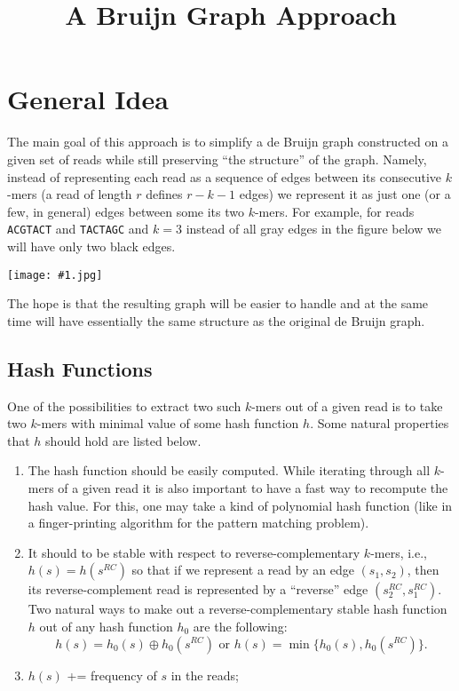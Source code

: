 \documentclass[12pt]{article}
\newcommand{\jpgpic}[1]{\begin{center}\texttt{[image: \#1.jpg]}\end{center}}
\begin{document}
\title{A Bruijn Graph Approach}
\maketitle

\section{General Idea}

The main goal of this approach is to simplify a de Bruijn graph
constructed on a given set of reads while still preserving 
``the structure'' of the graph. Namely, instead 
of representing each read as a sequence of edges 
between its consecutive $k$-mers (a read of length $r$ defines
$r-k-1$ edges) we represent it as just one (or a few, in general)
edges between some its two $k$-mers. For example, for 
reads {\tt ACGTACT} and {\tt TACTAGC} and $k=3$
instead of all gray edges in the figure below we will have 
only two black edges.
\jpgpic{fig1}
The hope is that the resulting graph will be easier to handle 
and at the same time will have essentially the same structure 
as the original de Bruijn graph.

\subsection{Hash Functions}

One of the possibilities to extract two such $k$-mers out of a given
read is to take two $k$-mers with minimal value of some hash function $h$.
Some natural properties that $h$ should hold are listed below.
\begin{enumerate}
  \item The hash function should be easily computed.
  While iterating through all $k$-mers of a given read
  it is also important to have a fast way to recompute 
  the hash value. For this, one may take a kind of polynomial
  hash function (like in a finger-printing algorithm for the pattern 
  matching problem).
  \item It should to be stable with respect to reverse-complementary 
  $k$-mers, i.e., $h(s) = h(s^{RC})$ so that if we represent a read
  by an edge $(s_1,s_2)$, then its reverse-complement read is represented by 
  a ``reverse'' edge $(s_2^{RC},s_1^{RC})$. Two natural ways to make out a
  reverse-complementary stable hash function $h$ out of any hash function 
  $h_0$ are the following:
  \[h(s) = h_0(s) \oplus h_0(s^{RC}) \textrm{ or } h(s) = \min\{h_0(s), h_0(s^{RC})\} .\]
  \item $h(s)$ += frequency of $s$ in the reads;

\end{enumerate}
\end{document}
